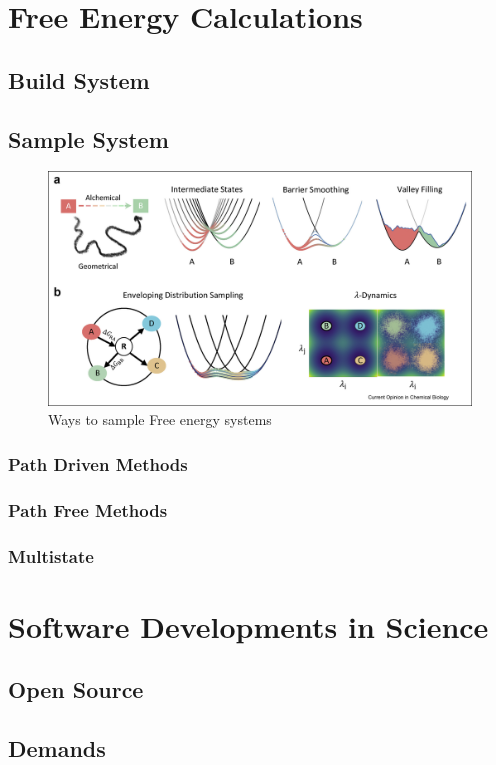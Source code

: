 \section{Free Energy Calculations}
\cite{Barros2022}

\subsection{Build System}


\subsection{Sample System}

\begin{figure}[h]
    \centering
    \includegraphics[width=\textwidth]{fig/freeEnergy/samplingMethods.jpg}
    \caption{Ways to sample Free energy systems \cite{Barros2022}}
    \label{fig:my_label}
\end{figure}

\subsubsection{Path Driven Methods}

\subsubsection{Path Free Methods}

\subsubsection{Multistate}



\section{Software Developments in Science}

\subsection{Open Source}

\subsection{Demands}

